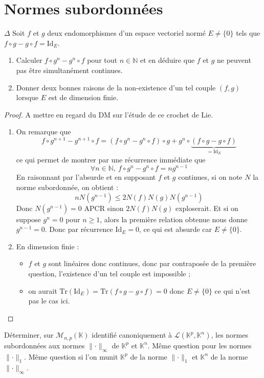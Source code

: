 \documentclass[french,a4paper]{article}
\newcommand{\N}{\mathbb{N}}
\newcommand{\K}{\mathbb{K}}
\newcommand{\Tr}{\text{Tr}}
\theoremstyle{plain}
\theoremstyle{definition}
\theoremstyle{remark}
\begin{document}
\section{Normes subordonnées}

\begin{ex}{$\Delta$}
	Soit $f$ et $g$ deux endomorphismes d'un espace vectoriel normé $E\ne\{0\}$ tels que $f\circ g-g\circ f=\text{Id}_E$.
	\begin{enumerate}
		\item Calculer $f\circ g^n-g^n\circ f$ pour tout $n\in\N$ et en déduire que $f$ et $g$ ne peuvent pas être simultanément continues.
		\item Donner deux bonnes raisons de la non-existence d'un tel couple $(f,g)$ lorsque $E$ est de dimension finie.
	\end{enumerate}
\end{ex}
\begin{proof}
	A mettre en regard du DM sur l'étude de ce crochet de Lie.
	\begin{enumerate}
		\item On remarque que $$f\circ g^{n+1}-g^{n+1}\circ f=(f\circ g^n-g^n\circ f)\circ g+g^n\circ \underbrace{(f\circ g-g\circ f)}_{=\text{Id}_E}$$ ce qui permet de montrer par une récurrence immédiate que $$\forall n\in\N,\ f\circ g^n-g^n\circ f=ng^{n-1}$$ En raisonnant par l'absurde et en supposant  $f$ et $g$ continues, si on note $N$ la norme subordonnée, on obtient :  $$nN(g^{n-1})\leqslant2N(f)N(g)N(g^{n-1})$$ Donc $N(g^{n-1})=0$ APCR sinon $2N(f)N(g)$ exploserait. Et si on suppose $g^{n}=0$ pour $n\geqslant 1$, alors la première relation obtenue nous donne $g^{n-1}=0$. Donc par récurrence $\text{Id}_E=0$, ce qui est absurde car $E\ne\{0\}$.
		\item En dimension finie :
		\begin{itemize}
			\item $f$ et $g$ sont linéaires donc continues, donc par contraposée de la première question, l'existence d'un tel couple est impossible ;
			\item on aurait $\Tr(\text{Id}_E)=\Tr(f\circ g-g\circ f)=0$ donc $E\ne\{0\}$ ce qui n'est pas le cas ici.
		\end{itemize}
	\end{enumerate}
\end{proof}

\begin{ex}{}
	Déterminer, sur $\mathcal{M}_{n,p}(\K)$ identifié canoniquement à $\mathcal{L}(\K^p,\K^n)$, les normes subordonnées aux normes $\lVert\cdot\rVert_\infty$ de $\K^p$ et $\K^n$. Même question pour les normes $\lVert\cdot\rVert_1$. Même question si l'on munit $\K^p$ de la norme $\lVert\cdot\rVert_1$ et $\K^n$ de la norme $\lVert\cdot\rVert_\infty$.
\end{ex}
\end{document}
